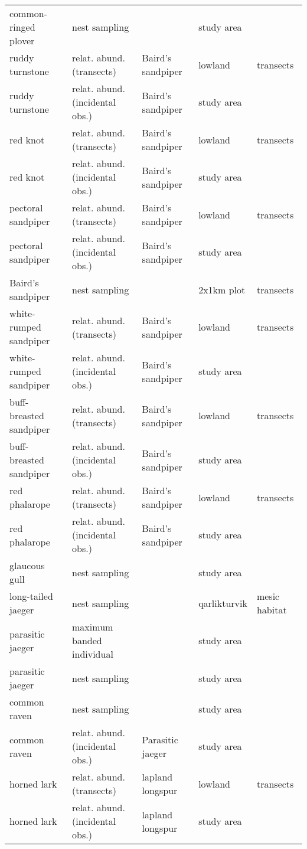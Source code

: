 \begin{table}[H]
\begin{tabularx}{\textwidth}{lllll}
  common-ringed plover & nest sampling &  & study area &  \\ 
  ruddy turnstone & relat. abund. (transects) & Baird’s sandpiper & lowland & transects \\ 
  ruddy turnstone & relat. abund. (incidental obs.) & Baird’s sandpiper & study area &  \\ 
  red knot & relat. abund. (transects) & Baird’s sandpiper & lowland & transects \\ 
  red knot & relat. abund. (incidental obs.) & Baird’s sandpiper & study area &  \\ 
  pectoral sandpiper & relat. abund. (transects) & Baird’s sandpiper & lowland & transects \\ 
  pectoral sandpiper & relat. abund. (incidental obs.) & Baird’s sandpiper & study area &  \\ 
  Baird’s sandpiper & nest sampling &  & 2x1km plot & transects \\ 
  white-rumped sandpiper & relat. abund. (transects) & Baird’s sandpiper & lowland & transects \\ 
  white-rumped sandpiper & relat. abund. (incidental obs.) & Baird’s sandpiper & study area &  \\ 
  buff-breasted sandpiper & relat. abund. (transects) & Baird’s sandpiper & lowland & transects \\ 
  buff-breasted sandpiper & relat. abund. (incidental obs.) & Baird’s sandpiper & study area &  \\ 
  red phalarope & relat. abund. (transects) & Baird’s sandpiper & lowland & transects \\ 
  red phalarope & relat. abund. (incidental obs.) & Baird’s sandpiper & study area &  \\ 
  glaucous gull & nest sampling &  & study area &  \\ 
  long-tailed jaeger & nest sampling &  & qarlikturvik & mesic habitat \\ 
  parasitic jaeger & maximum banded individual &  & study area &  \\ 
  parasitic jaeger & nest sampling &  & study area &  \\ 
  common raven & nest sampling &  & study area &  \\ 
  common raven & relat. abund. (incidental obs.) & Parasitic jaeger & study area &  \\ 
  horned lark & relat. abund. (transects) & lapland longspur & lowland & transects \\ 
  horned lark & relat. abund. (incidental obs.) & lapland longspur & study area &  \\ 

\end{tabularx}
\end{table}
